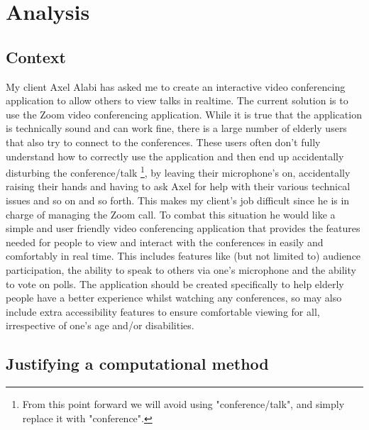 \pagestyle{fancy}
\chead{\sffamily \thepage}

\chapter{Analysis}

\section{Context}
\label{sec:context}

My client Axel Alabi has asked me to create an interactive
video conferencing application to allow others to view talks 
in realtime. The current solution is to use the Zoom 
video conferencing application. While it is true that the 
application is technically sound and can work fine, there is a
large number of elderly users that also try to connect to the 
conferences. These users often don't fully understand how to 
correctly use the application and then end up accidentally 
disturbing the conference/talk \footnote{From this point 
forward we will avoid using "conference/talk", and simply
replace it with "conference".}, by leaving their microphone's
on, accidentally raising their hands and having to ask Axel
for help with their various technical issues and so on and so
forth. This makes my client's job difficult since he is in 
charge of managing the Zoom call. To combat this situation 
he would like a simple and user friendly video conferencing 
application that provides the features needed for people to 
view and interact with the conferences in easily and
comfortably in real time. This includes 
features like (but not limited to) audience participation,
the ability to speak to others via one's microphone and the
ability to vote on polls. The application should be
created specifically to help elderly people have a better 
experience whilst watching any conferences, so may also
include extra accessibility features to ensure comfortable
viewing for all, irrespective of one's age and/or disabilities.

\section{Justifying a computational method}
\label{sec:computational}

